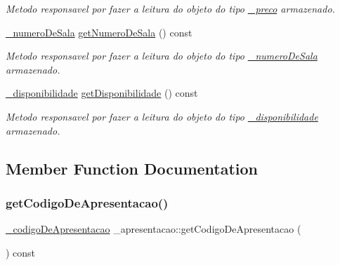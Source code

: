 \begin{DoxyCompactItemize}
\begin{DoxyCompactList}\small\item\em Metodo responsavel por fazer a leitura do objeto do tipo \mbox{\hyperlink{class__preco}{\+\_\+preco}} armazenado. \end{DoxyCompactList}\item 
\mbox{\hyperlink{class__numero_de_sala}{\+\_\+numero\+De\+Sala}} \mbox{\hyperlink{class__apresentacao_a5a6b1255c1816a5b566e6ca9e3e0b097}{get\+Numero\+De\+Sala}} () const
\begin{DoxyCompactList}\small\item\em Metodo responsavel por fazer a leitura do objeto do tipo \mbox{\hyperlink{class__numero_de_sala}{\+\_\+numero\+De\+Sala}} armazenado. \end{DoxyCompactList}\item 
\mbox{\hyperlink{class__disponibilidade}{\+\_\+disponibilidade}} \mbox{\hyperlink{class__apresentacao_a0d7f30c7cec0cb4b41819ff7364f347d}{get\+Disponibilidade}} () const
\begin{DoxyCompactList}\small\item\em Metodo responsavel por fazer a leitura do objeto do tipo \mbox{\hyperlink{class__disponibilidade}{\+\_\+disponibilidade}} armazenado. \end{DoxyCompactList}\end{DoxyCompactItemize}


\subsection{Member Function Documentation}
\mbox{\label{class__apresentacao_aa51711787949191588c4ed23ed48c859}} 
\subsubsection{\texorpdfstring{getCodigoDeApresentacao()}{getCodigoDeApresentacao()}}
{\footnotesize\ttfamily \mbox{\hyperlink{class__codigo_de_apresentacao}{\+\_\+codigo\+De\+Apresentacao}} \+\_\+apresentacao\+::get\+Codigo\+De\+Apresentacao (\begin{DoxyParamCaption}{ }\end{DoxyParamCaption}) const}



